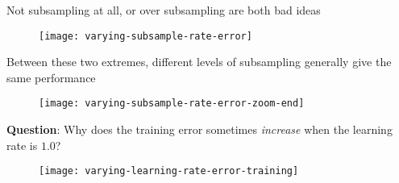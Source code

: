 %
\begin{frame}
Not subsampling at all, or over subsampling are both bad ideas

  \begin{figure}
    \texttt{[image: varying-subsample-rate-error]}
  \end{figure}
 
\end{frame}
%
\begin{frame}
Between these two extremes, different levels of subsampling generally give the same performance

  \begin{figure}
    \texttt{[image: varying-subsample-rate-error-zoom-end]}
  \end{figure}
  
\end{frame}
%


\begin{frame}
\textbf{Question}: Why does the training error sometimes \textit{increase} when the learning rate is $1.0$?

  \begin{figure}
    \texttt{[image: varying-learning-rate-error-training]}
  \end{figure}
  
\end{frame}
%


